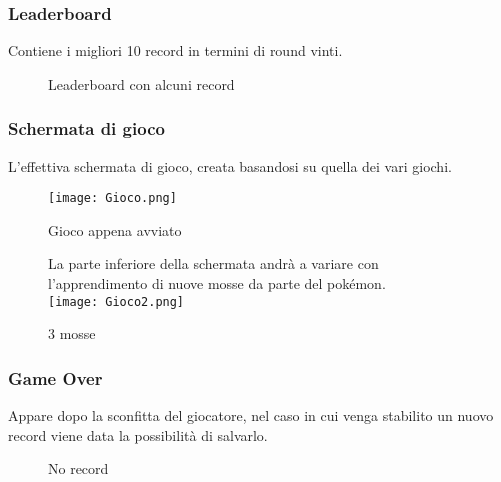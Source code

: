 \documentclass{article}
\begin{document}
    \subsubsection{Leaderboard}

        Contiene i migliori 10 record in termini di round vinti.

        \vspace{5pt}

        \begin{figure}[ht]
            \centering
            \caption{Leaderboard con alcuni record}
            \label{fig:leaderboard.png}
        \end{figure}

    \newpage

    \subsubsection{Schermata di gioco}

        L'effettiva schermata di gioco, creata basandosi su quella dei vari giochi.

        \begin{figure}[h]
            \centering
            \texttt{[image: Gioco.png]}
            \caption{Gioco appena avviato}
            \label{fig:gioco.png}
            \vspace{11pt}
            La parte inferiore della schermata andrà a variare con l'apprendimento di nuove mosse da parte del pokémon.\\
            \vspace{5pt}
            \texttt{[image: Gioco2.png]}
            \caption{3 mosse}
            \label{fig:gioco2.png}
        \end{figure}

    \subsubsection{Game Over}

        Appare dopo la sconfitta del giocatore, nel caso in cui venga stabilito un nuovo record viene data la possibilità di salvarlo.

        \vspace{3pt}

        \begin{figure}[h]
            \centering
            \caption{No record}
            \label{fig:game_over.png}
        \end{figure}
\end{document}
